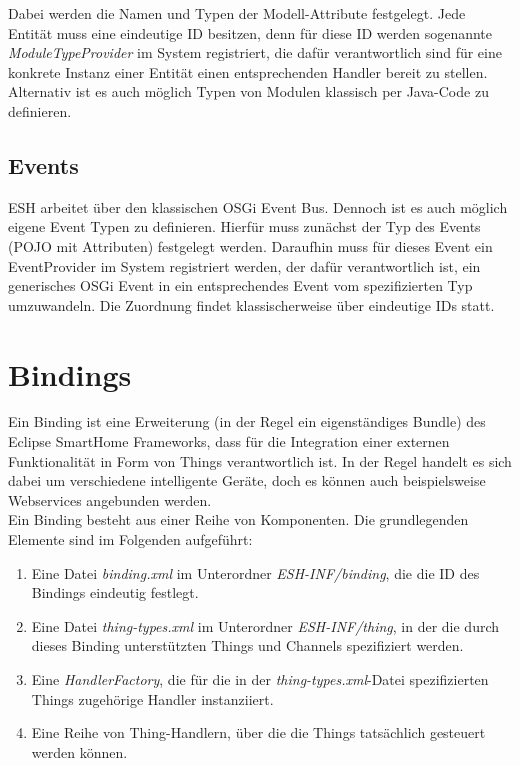 Dabei werden die Namen und Typen der Modell-Attribute festgelegt. Jede Entität muss eine eindeutige ID besitzen, denn für diese ID werden sogenannte \textit{ModuleTypeProvider} im System registriert, die dafür verantwortlich sind für eine konkrete Instanz einer Entität einen entsprechenden Handler bereit zu stellen.\\

Alternativ ist es auch möglich Typen von Modulen klassisch per Java-Code zu definieren.

\subsection{Events}
ESH arbeitet über den klassischen OSGi Event Bus. Dennoch ist es auch möglich eigene Event Typen zu definieren. Hierfür muss zunächst der Typ des Events (POJO mit Attributen) festgelegt werden. Daraufhin muss für dieses Event ein EventProvider im System registriert werden, der dafür verantwortlich ist, ein generisches OSGi Event in ein entsprechendes Event vom spezifizierten Typ umzuwandeln. Die Zuordnung findet klassischerweise über eindeutige IDs statt.


\section{Bindings}
Ein Binding ist eine Erweiterung (in der Regel ein eigenständiges Bundle) des Eclipse SmartHome Frameworks, dass für die Integration einer externen Funktionalität in Form von Things verantwortlich ist. 
In der Regel handelt es sich dabei um verschiedene intelligente Geräte, doch es können auch beispielsweise Webservices angebunden werden.\\

Ein Binding besteht aus einer Reihe von Komponenten. Die grundlegenden Elemente sind im Folgenden aufgeführt:

\begin{enumerate}
\item Eine Datei \textit{binding.xml} im Unterordner \textit{ESH-INF/binding}, die die ID des Bindings eindeutig festlegt.
\item Eine Datei \textit{thing-types.xml} im Unterordner \textit{ESH-INF/thing}, in der die durch dieses Binding unterstützten Things und Channels spezifiziert werden.
\item Eine \textit{HandlerFactory}, die für die in der \textit{thing-types.xml}-Datei spezifizierten Things zugehörige Handler instanziiert.
\item Eine Reihe von Thing-Handlern, über die die Things tatsächlich gesteuert werden können.
\end{enumerate}


